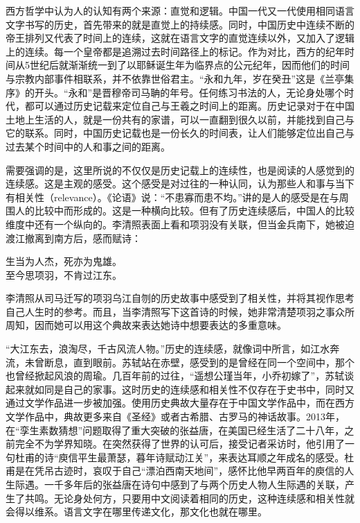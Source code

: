 
西方哲学中认为人的认知有两个来源：直觉和逻辑。中国一代又一代使用相同语言文字书写的历史，首先带来的就是直觉上的持续感。同时，中国历史中连续不断的帝王排列又代表了时间上的连续，这就在语言文字的直觉连续以外，又加入了逻辑上的连续。每一个皇帝都是追溯过去时间路径上的标记。作为对比，西方的纪年时间从5世纪后就渐渐统一到了以耶稣诞生年为临界点的公元纪年，因而他们的时间与宗教内部事件相联系，并不依靠世俗君主。“永和九年，岁在癸丑”这是《兰亭集序》的开头。“永和”是晋穆帝司马聃的年号。任何练习书法的人，无论身处哪个时代，都可以通过历史记载来定位自己与王羲之时间上的距离。历史记录对于在中国土地上生活的人，就是一份共有的家谱，可以一直翻到很久以前，并能找到自己与它的联系。同时，中国历史记载也是一份长久的时间表，让人们能够定位出自己与过去某个时间中的人和事之间的距离。



需要强调的是，这里所说的不仅仅是历史记载上的连续性，也是阅读的人感觉到的连续感。这是主观的感受。这个感受是对过往的一种认同，认为那些人和事与当下有相关性（relevance）。《论语》说：“不患寡而患不均。”讲的是人的感受是在与周围人的比较中而形成的。这是一种横向比较。但有了历史连续感后，中国人的比较维度中还有一个纵向的。李清照表面上看和项羽没有关联，但当金兵南下，她被迫渡江撤离到南方后，感而赋诗：



\begin{bookquote}
生当为人杰，死亦为鬼雄。\\
至今思项羽，不肯过江东。
\end{bookquote}


李清照从司马迁写的项羽乌江自刎的历史故事中感受到了相关性，并将其视作思考自己人生时的参考。而且，当李清照写下这首诗的时候，她非常清楚项羽之事众所周知，因而她可以用这个典故来表达她诗中想要表达的多重意味。



“大江东去，浪淘尽，千古风流人物。”历史的连续感，就像词中所言，如江水奔流，未曾断息，直到眼前。苏轼站在赤壁，感受到的是曾经在同一个空间中，那个也曾经掀起风浪的周瑜。几百年前的过往，“遥想公瑾当年，小乔初嫁了”，苏轼谈起来就如同是自己的家事。这时历史的连续感和相关性不仅存在于史书中，同时又通过文学作品进一步被加强。使用历史典故大量存在于中国文学作品中，而在西方文学作品中，典故更多来自《圣经》或者古希腊、古罗马的神话故事。2013年，在“孪生素数猜想”问题取得了重大突破的张益唐，在美国已经生活了二十八年，之前完全不为学界知晓。在突然获得了世界的认可后，接受记者采访时，他引用了一句杜甫的诗“庾信平生最萧瑟，暮年诗赋动江关”，来表达耳顺之年成名的感受。杜甫是在凭吊古迹时，哀叹于自己“漂泊西南天地间”，感怀比他早两百年的庾信的人生际遇。一千多年后的张益唐在诗句中感到了与两个历史人物人生际遇的关联，产生了共鸣。无论身处何方，只要用中文阅读着相同的历史，这种连续感和相关性就会得以维系。语言文字在哪里传递文化，那文化也就在哪里。


